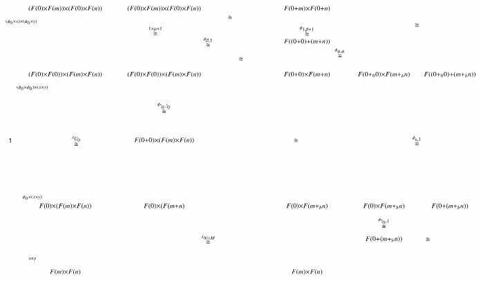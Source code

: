 \documentclass[reqno]{amsart}
\begin{document}
\[
\begin{tikzpicture}[scale=1.6]
\node () at (3,-2.5) {$\scriptstyle{\stackrel{\lambda_{U_0}}\cong}$};
\node () at (8,-2.5) {$\scriptstyle{\cong}$};
\node () at (5,-1.75) {$\scriptstyle{\stackrel{\phi_{!_0,!_0}}\cong}$};
\node () at (10.75,-2.5) {$\scriptstyle{\stackrel{\phi_{\kappa,1}}\cong}$};
\node () at (4.8,0) {$\scriptstyle{\stackrel{1 \times \mu \times 1}\cong}$};
\node () at (6.5,0.3) {$\scriptstyle{\cong}$};
\node () at (6,-0.25) {$\scriptstyle{\stackrel{\phi_{\beta,1}}\cong}$};
\node () at (8.25,0) {$\scriptstyle{\stackrel{\phi_{1,\beta+1}}\cong}$};
\node () at (6.75,-.65) {$\scriptstyle{\cong}$};
\node () at (9,-0.5) {$\scriptstyle{\stackrel{\phi_{\psi,\psi}}\cong}$};
\node () at (10.75,0.125) {$\scriptstyle{\cong}$};
\node (A) at (2.75,-1) {$\scriptstyle{(F(0) \times F(0)) \times (F(m) \times F(n))}$};
\node (A') at (5,-1) {$\scriptstyle{(F(0) \times F(0)) \times (F(m) \times F(n))}$};
\node (A'') at (8.25,-1) {$\scriptstyle{F(0+0) \times F(m+n)}$};
\node (A''') at (10,-1) {$\scriptstyle{F(0+_0 0) \times F(m+_b n)}$};
\node (A'''') at (11.5,-1) {$\scriptstyle{F((0+_0 0)+(m+_b n))}$};
\node (J) at (5,-2.5) {$\scriptstyle{F(0+0) \times (F(m) \times F(n))}$};
\node (J') at (6,-4.75) {$\scriptstyle{\stackrel{\lambda_{N \odot M}}\cong}$};
\node (J''') at (10,-4.375) {$\scriptstyle{\stackrel{\phi_{!_0,1}} \cong}$};
\node (J'''') at (11,-4.75) {$\scriptstyle{\cong}$};
\node (K) at (2.75,-4) {$\scriptstyle{F(0) \times (F(m) \times F(n))}$};
\node (K') at (5,-4) {$\scriptstyle{F(0) \times (F(m+n)}$};
\node (Y) at (10,-4.75) {$\scriptstyle{F(0+(m+_b n))}$};
\node (K'') at (8.25,-4) {$\scriptstyle{F(0) \times F(m+_b n)}$};
\node (K''') at (10,-4) {$\scriptstyle{F(0) \times F(m+_b n)}$};
\node (K'''') at (11.5,-4) {$\scriptstyle{F(0+(m+_b n))}$};
\node (D) at (1.5,-2.5) {$\scriptstyle{\one}$};
\node (E) at (8.25,0.5) {$\scriptstyle{F(0+m) \times F(0+n)}$};
\node (E') at (8.25,-0.25) {$\scriptstyle{F((0+0)+(m+n))}$};
\node (G) at (2.75,0.5) {$\scriptstyle{(F(0) \times F(m)) \times (F(0) \times F(n))}$};
\node (H) at (5,0.5) {$\scriptstyle{(F(0) \times F(m)) \times (F(0) \times F(n))}$};
\node (G'') at (2.75,-5.5) {$\scriptstyle{F(m) \times F(n)}$};
\node (B'') at (8.25,-5.5) {$\scriptstyle{F(m) \times F(n)}$};
\node (X) at (1.75,0.2) {$\scriptscriptstyle{(\phi_0 \times x) \times (\phi_0 \times y)}$};
\node (X') at (2,-1.3) {$\scriptscriptstyle{(\phi_0 \times \phi_0) \times (x \times y)}$};
\node (X') at (2,-3.8) {$\scriptscriptstyle{\phi_0 \times (x \times y)}$};
\node (X'') at (2,-5.2) {$\scriptscriptstyle{x \times y}$};

\end{tikzpicture}\]
\end{document}
